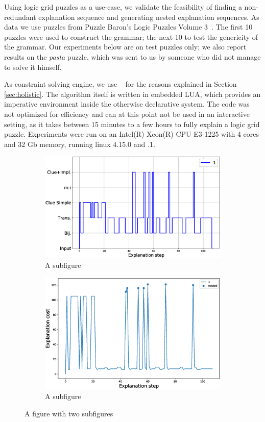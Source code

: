 Using logic grid puzzles as a use-case, we validate the feasibility of finding a non-redundant explanation sequence and generating nested explanation sequences.
As data we use puzzles from Puzzle Baron’s Logic Puzzles Volume 3~\cite{logigrammen}. The first 10 puzzles were used to construct the grammar; the next 10 to test the genericity of the grammar. 
Our experiments below are on test puzzles only; we also report results on the \textit{pasta} puzzle, which was sent to us by someone who did not manage to solve it himself.

As constraint solving engine, we use \idp~\cite{IDP} for the reasons explained in Section \ref{sec:holistic}. 
The algorithm itself is written in embedded LUA, which provides an imperative environment inside the otherwise declarative \idp system. The code was not optimized for efficiency and can at this point not be used in an interactive setting, as it takes between 15 minutes to a few hours to fully explain a logic grid puzzle. Experiments were run on an Intel(R) Xeon(R) CPU E3-1225 with 4 cores and 32 Gb memory, running linux 4.15.0 and .1.

\begin{figure}
\centering
\begin{subfigure}{.5\textwidth}
\centering
\includegraphics[width=0.98\linewidth]{figures/plot_cost_steps_1.eps}
\caption{A subfigure}
\label{fig:sub1}
\end{subfigure}%
\begin{subfigure}{.5\textwidth}
\centering
\includegraphics[width=0.9\linewidth]{figures/1.eps}
\caption{A subfigure}
\label{fig:sub2}
\end{subfigure}
\caption{A figure with two subfigures}
\label{fig:test}
\end{figure}


